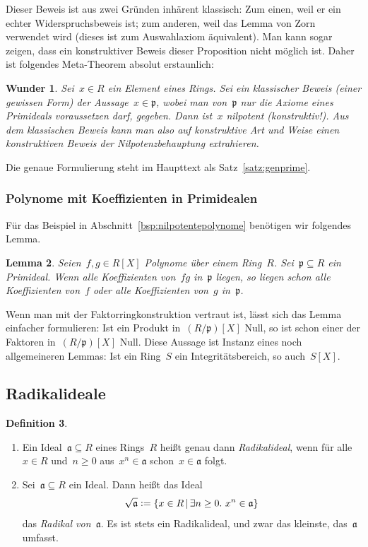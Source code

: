 \documentclass[a4paper,ngerman,12pt]{scrartcl}
\theoremstyle{definition}
\newtheorem{defn}{Definition}[section]
\theoremstyle{plain}
\newtheorem{wunder}[defn]{Wunder}
\newtheorem{lemma}[defn]{Lemma}
\theoremstyle{remark}
\renewcommand{\aa}{\mathfrak{a}}
\newcommand{\pp}{\mathfrak{p}}
\renewcommand{\_}{\mathpunct{.}\,}
\newcommand{\?}{\,{:}\,}
\newcommand{\defeq}{\vcentcolon=}
\begin{document}
Dieser Beweis ist aus zwei Gründen inhärent klassisch: Zum einen, weil
er ein echter Widerspruchsbeweis ist; zum anderen, weil das Lemma von Zorn
verwendet wird (dieses ist zum Auswahlaxiom äquivalent). Man kann sogar zeigen,
dass ein konstruktiver Beweis dieser Proposition nicht möglich ist. Daher
ist folgendes Meta-Theorem absolut erstaunlich:

\begin{wunder}Sei~$x \in R$ ein Element eines Rings. Sei ein \emph{klassischer
Beweis} (einer gewissen Form) der Aussage~$x \in \pp$, wobei man von~$\pp$ nur
die Axiome eines Primideals voraussetzen darf, gegeben. Dann ist~$x$ nilpotent
(konstruktiv!). Aus dem klassischen Beweis kann man also auf konstruktive Art
und Weise einen konstruktiven Beweis der Nilpotenzbehauptung extrahieren.
\end{wunder}

Die genaue Formulierung steht im Haupttext als Satz~\ref{satz:genprime}.


\subsubsection*{Polynome mit Koeffizienten in Primidealen}

Für das Beispiel in Abschnitt~\ref{bsp:nilpotentepolynome} benötigen wir
folgendes Lemma.
\begin{lemma}\label{produktprim}Seien~$f,g \in R[X]$ Polynome über einem Ring~$R$. Sei~$\pp
\subseteq R$ ein Primideal. Wenn alle Koeffizienten von~$fg$ in~$\pp$ liegen,
so liegen schon alle Koeffizienten von~$f$ oder alle Koeffizienten von~$g$
in~$\pp$.\end{lemma}
Wenn man mit der Faktorringkonstruktion vertraut ist, lässt sich das Lemma
einfacher formulieren: Ist ein Produkt in~$(R/\pp)[X]$ Null, so ist schon einer
der Faktoren in~$(R/\pp)[X]$ Null. Diese Aussage ist Instanz eines noch
allgemeineren Lemmas: Ist ein Ring~$S$ ein Integritätsbereich, so auch~$S[X]$.


\subsection{Radikalideale}

\begin{defn}\label{def:radikal}\begin{enumerate}
\item Ein Ideal~$\aa \subseteq R$ eines Rings~$R$ heißt genau dann
\emph{Radikalideal}, wenn für alle~$x
\in R$ und~$n \geq 0$ aus~$x^n \in \aa$ schon~$x \in \aa$ folgt.
\item Sei~$\aa \subseteq R$ ein Ideal. Dann heißt das Ideal
\[ \sqrt{\aa} \defeq \{ x \in R \,|\, \exists n \geq 0\_ x^n \in \aa \} \]
das \emph{Radikal von~$\aa$}. Es ist stets ein Radikalideal, und zwar das
kleinste, das~$\aa$ umfasst.
\end{enumerate}\end{defn}
\end{document}
